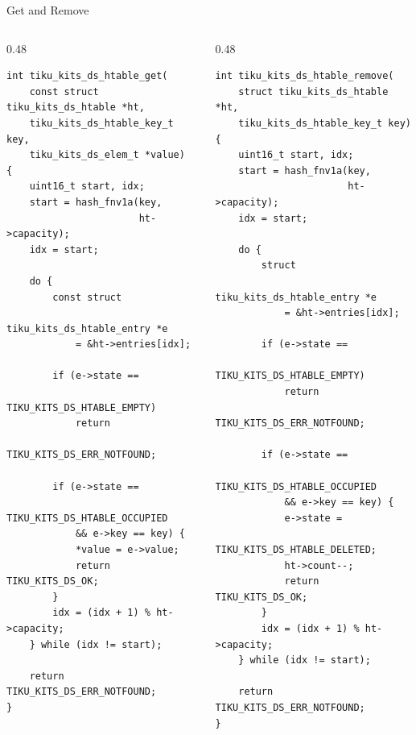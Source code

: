 \documentclass[aspectratio=169, 10pt]{beamer}
\begin{document}
\begin{frame}[fragile]{Get and Remove}
\begin{columns}[T]
\begin{column}{0.48\textwidth}
\begin{lstlisting}[style=cstyle,
  title={get --- linear probe lookup}]
int tiku_kits_ds_htable_get(
    const struct tiku_kits_ds_htable *ht,
    tiku_kits_ds_htable_key_t key,
    tiku_kits_ds_elem_t *value)
{
    uint16_t start, idx;
    start = hash_fnv1a(key,
                       ht->capacity);
    idx = start;

    do {
        const struct
            tiku_kits_ds_htable_entry *e
            = &ht->entries[idx];

        if (e->state ==
            TIKU_KITS_DS_HTABLE_EMPTY)
            return
              TIKU_KITS_DS_ERR_NOTFOUND;

        if (e->state ==
            TIKU_KITS_DS_HTABLE_OCCUPIED
            && e->key == key) {
            *value = e->value;
            return TIKU_KITS_DS_OK;
        }
        idx = (idx + 1) % ht->capacity;
    } while (idx != start);

    return TIKU_KITS_DS_ERR_NOTFOUND;
}
\end{lstlisting}
\end{column}

\begin{column}{0.48\textwidth}
\begin{lstlisting}[style=cstyle,
  title={remove --- tombstone deletion}]
int tiku_kits_ds_htable_remove(
    struct tiku_kits_ds_htable *ht,
    tiku_kits_ds_htable_key_t key)
{
    uint16_t start, idx;
    start = hash_fnv1a(key,
                       ht->capacity);
    idx = start;

    do {
        struct
            tiku_kits_ds_htable_entry *e
            = &ht->entries[idx];

        if (e->state ==
            TIKU_KITS_DS_HTABLE_EMPTY)
            return
              TIKU_KITS_DS_ERR_NOTFOUND;

        if (e->state ==
            TIKU_KITS_DS_HTABLE_OCCUPIED
            && e->key == key) {
            e->state =
              TIKU_KITS_DS_HTABLE_DELETED;
            ht->count--;
            return TIKU_KITS_DS_OK;
        }
        idx = (idx + 1) % ht->capacity;
    } while (idx != start);

    return TIKU_KITS_DS_ERR_NOTFOUND;
}
\end{lstlisting}
\end{column}
\end{columns}
\end{frame}
\end{document}
